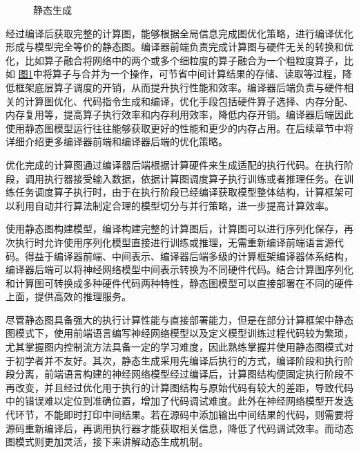 \documentclass[letterpaper,10pt,english]{sphinxmanual}
\let\sphinxpxdimen\pdfpxdimen\else\newdimen\sphinxpxdimen
\begin{document}
\begin{figure}[H]
\centering
\capstart

\noindent\sphinxincludegraphics[width=800\sphinxpxdimen]{{static-gen}.svg}
\caption{静态生成}\label{\detokenize{chapter_computational_graph/generation_of_computational_graph:id7}}\label{\detokenize{chapter_computational_graph/generation_of_computational_graph:staticgen}}\end{figure}

\sphinxAtStartPar
经过编译后获取完整的计算图，能够根据全局信息完成图优化策略，进行编译优化形成与模型完全等价的静态图。编译器前端负责完成计算图与硬件无关的转换和优化，比如算子融合将网络中的两个或多个细粒度的算子融合为一个粗粒度算子，比如
\hyperref[\detokenize{chapter_computational_graph/generation_of_computational_graph:staticgen}]{图\ref{\detokenize{chapter_computational_graph/generation_of_computational_graph:staticgen}}}中将算子与合并为一个操作，可节省中间计算结果的存储、读取等过程，降低框架底层算子调度的开销，从而提升执行性能和效率。编译器后端负责与硬件相关的计算图优化、代码指令生成和编译，优化手段包括硬件算子选择、内存分配、内存复用等，提高算子执行效率和内存利用效率，降低内存开销。编译器后端因此使用静态图模型运行往往能够获取更好的性能和更少的内存占用。在后续章节中将详细介绍更多编译器前端和编译器后端的优化策略。

\sphinxAtStartPar
优化完成的计算图通过编译器后端根据计算硬件来生成适配的执行代码。在执行阶段，调用执行器接受输入数据，依据计算图调度算子执行训练或者推理任务。在训练任务调度算子执行时，由于在执行阶段已经编译获取模型整体结构，计算框架可以利用自动并行算法制定合理的模型切分与并行策略，进一步提高计算效率。

\sphinxAtStartPar
使用静态图构建模型，编译构建完整的计算图后，计算图可以进行序列化保存，再次执行时允许使用序列化模型直接进行训练或推理，无需重新编译前端语言源代码。得益于编译器前端、中间表示、编译器后端多级的计算框架编译器体系结构，编译器后端可以将神经网络模型中间表示转换为不同硬件代码。结合计算图序列化和计算图可转换成多种硬件代码两种特性，静态图模型可以直接部署在不同的硬件上面，提供高效的推理服务。

\sphinxAtStartPar
尽管静态图具备强大的执行计算性能与直接部署能力，但是在部分计算框架中静态图模式下，使用前端语言编写神经网络模型以及定义模型训练过程代码较为繁琐，尤其掌握图内控制流方法具备一定的学习难度，因此熟练掌握并使用静态图模式对于初学者并不友好。其次，静态生成采用先编译后执行的方式，编译阶段和执行阶段分离，前端语言构建的神经网络模型经过编译后，计算图结构便固定执行阶段不再改变，并且经过优化用于执行的计算图结构与原始代码有较大的差距，导致代码中的错误难以定位到准确位置，增加了代码调试难度。此外在神经网络模型开发迭代环节，不能即时打印中间结果。若在源码中添加输出中间结果的代码，则需要将源码重新编译后，再调用执行器才能获取相关信息，降低了代码调试效率。而动态图模式则更加灵活，接下来讲解动态生成机制。
\end{document}
